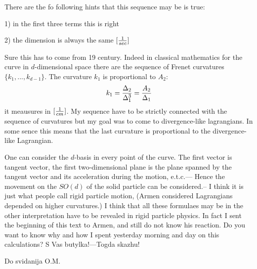 There are the fo following hints that
    this sequence may be is true:

  1) in the first three terms this is right

  2) the dimension is always the same $[{1\over sec}]$

 Sure this has to come from 19 century. Indeed in classical mathematics
 for the curve in $d$-dimensional space there are the sequence of Frenet
  curvatures $\{k_1,...,k_{d-1}\}$. The curvature $k_1$ is proportional
 to $A_2$:
               $$
    k_1={\Delta_2\over\Delta_1^3}={A_2\over\Delta_1}
                $$
  it meausures in $[{1\over cm}]$.
My sequence have to be strictly connected with the sequence
 of curvatures but my goal was to come to divergence-like
 lagrangians. In some sence this means that the last
curvature is proportional to the divergence-like Lagrangian.

  One can consider the $d$-basis in every point of the curve.
The first vector is tangent vector, the first two-dimensional plane
is the plane spanned by the tangent vector and its acceleration
during the motion, e.t.c.--- Hence the movement on the
  $SO(d)$ of the solid particle can be considered.-- I think
it is just what people call rigid particle motion,
 (Armen considered Lagrangians depended on higher curvatures.)
  I think that all these formulaes may be in the other
 interpretation have to be revealed in rigid particle physics.
   In fact I sent the beginning of this text to Armen,
  and still do not know his reaction.
  Do you want to know why and how I spent yesterday
 morning and day on this calculations?
          S Vas butylka!---Togda skazhu!

            Do svidanija O.M.
\bye



